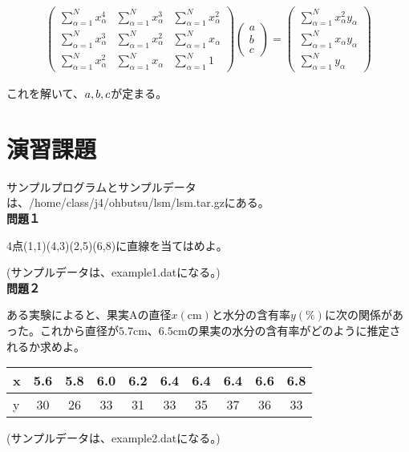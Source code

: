 \documentclass[a4]{jarticle}
\begin{document}
\begin{eqnarray}
\left(
\begin{array}{ccc}
\sum_{\alpha = 1}^{N}x^4_\alpha & \sum_{\alpha = 1}^{N}x^3_\alpha & \sum_{\alpha = 1}^{N}x^2_\alpha\\
\sum_{\alpha = 1}^{N}x^3_\alpha & \sum_{\alpha = 1}^{N}x^2_\alpha & \sum_{\alpha = 1}^{N}x_\alpha\\
\sum_{\alpha = 1}^{N}x^2_\alpha & \sum_{\alpha = 1}^{N}x_\alpha & \sum_{\alpha = 1}^{N}1
\end{array}
\right)
\left(
\begin{array}{ccc}
a \\
b \\
c
\end{array}
\right)
=
\left(
\begin{array}{cc}
\sum_{\alpha = 1}^{N}x^2_\alpha y_\alpha \\
\sum_{\alpha = 1}^{N}x_\alpha y_\alpha \\
\sum_{\alpha = 1}^{N}y_\alpha
\end{array}
\right)
\end{eqnarray}

これを解いて、${\sl a,b,c}$が定まる。

\section{演習課題}
サンプルプログラムとサンプルデータは、/home/class/j4/ohbutsu/lsm/lsm.tar.gzにある。\\

{\bf 問題１}

4点(1,1)(4,3)(2,5)(6,8)に直線を当てはめよ。

(サンプルデータは、example1.datになる。)　\\

{\bf 問題２}

ある実験によると、果実Aの直径$x\mathrm{(cm)}$と水分の含有率$y\mathrm{(\%)}$に次の関係があった。これから直径が$5.7\mathrm{cm}、6.5\mathrm{cm}$の果実の水分の含有率がどのように推定されるか求めよ。

\begin{table}[h]
\begin{center}
\begin{tabular}{l|ccccccccc}
x & 5.6 & 5.8 & 6.0 & 6.2 & 6.4 & 6.4 & 6.4 & 6.6 & 6.8 \\ \hline
y & 30 & 26 & 33 & 31 & 33 & 35 & 37 & 36 & 33
\end{tabular}
\end{center}
\end{table}
(サンプルデータは、example2.datになる。)　\\
\end{document}
